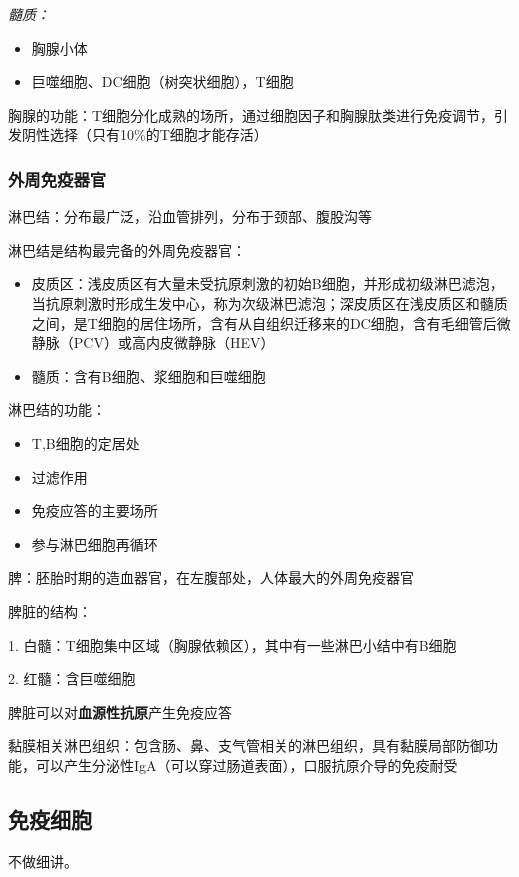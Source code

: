 \textit{髓质：}
\begin{itemize}
    \item 胸腺小体
    \item 巨噬细胞、DC细胞（树突状细胞），T细胞
    
\end{itemize}
\begin{notation}
    胸腺的功能：T细胞分化成熟的场所，通过细胞因子和胸腺肽类进行免疫调节，引发阴性选择（只有10\%的T细胞才能存活）
\end{notation}
\subsubsection*{外周免疫器官}%
\label{subsub:外周免疫器官}
\begin{notation}
淋巴结：分布最广泛，沿血管排列，分布于颈部、腹股沟等
\end{notation}
淋巴结是结构最完备的外周免疫器官：
\begin{itemize}
    \item 皮质区：浅皮质区有大量未受抗原刺激的初始B细胞，并形成初级淋巴滤泡，当抗原刺激时形成生发中心，称为次级淋巴滤泡；深皮质区在浅皮质区和髓质之间，是T细胞的居住场所，含有从自组织迁移来的DC细胞，含有毛细管后微静脉（PCV）或高内皮微静脉（HEV）
    \item 髓质：含有B细胞、浆细胞和巨噬细胞
    
\end{itemize}
淋巴结的功能：
\begin{itemize}
    \item T,B细胞的定居处
    \item 过滤作用
    \item 免疫应答的主要场所
    \item 参与淋巴细胞再循环
\end{itemize}
\begin{notation}
    脾：胚胎时期的造血器官，在左腹部处，人体最大的外周免疫器官
\end{notation}
脾脏的结构：

1. 白髓：T细胞集中区域（胸腺依赖区），其中有一些淋巴小结中有B细胞 

2. 红髓：含巨噬细胞

脾脏可以对\textbf{血源性抗原}产生免疫应答
\begin{notation}
    黏膜相关淋巴组织：包含肠、鼻、支气管相关的淋巴组织，具有黏膜局部防御功能，可以产生分泌性IgA（可以穿过肠道表面），口服抗原介导的免疫耐受
\end{notation}
\subsection{免疫细胞}%
\label{sub:免疫细胞}
不做细讲。
